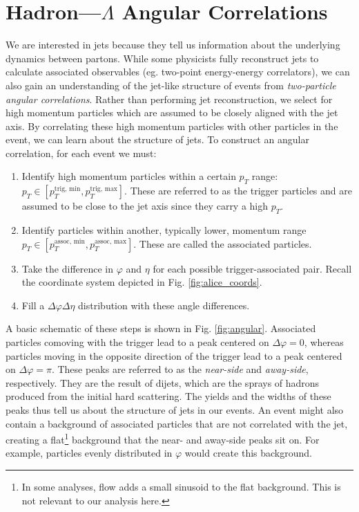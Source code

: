 \documentclass[../main.tex]{subfiles}
\begin{document}
\clearpage
\section{Hadron---$\Lambda$ Angular Correlations}
We are interested in jets because they tell us information about the underlying dynamics between partons. While some physicists fully reconstruct jets to calculate associated observables (eg. two-point energy-energy correlators), we can also gain an understanding of the jet-like structure of events from \textit{two-particle angular correlations}. Rather than performing jet reconstruction, we select for high momentum particles which are assumed to be closely aligned with the jet axis. By correlating these high momentum particles with other particles in the event, we can learn about the structure of jets. To construct an angular correlation, for each event we must:

\begin{enumerate}
    \item Identify high momentum particles within a certain $p_T$ range: $p_T \in [p_T^{\text{trig, min}}, p_T^{\text{trig, max}}]$. These are referred to as the trigger particles and are assumed to be close to the jet axis since they carry a high $p_T$. 
    \item Identify particles within another, typically lower, momentum range $p_T \in [p_T^{\text{assoc, min}}, p_T^{\text{assoc, max}}]$. These are called the associated particles. 
    \item Take the difference in $\varphi$ and $\eta$ for each possible trigger-associated pair. Recall the coordinate system depicted in Fig. \ref{fig:alice_coords}.
    \item Fill a $\Delta\varphi\Delta\eta$ distribution with these angle differences. 
\end{enumerate}


A basic schematic of these steps is shown in Fig. \ref{fig:angular}. Associated particles comoving with the trigger lead to a peak centered on $\Delta\varphi=0$, whereas particles moving in the opposite direction of the trigger lead to a peak centered on $\Delta\varphi=\pi$. These peaks are referred to as the \textit{near-side} and \textit{away-side}, respectively. They are the result of dijets, which are the sprays of hadrons produced from the initial hard scattering. The yields and the widths of these peaks thus tell us about the structure of jets in our events. An event might also contain a background of associated particles that are not correlated with the jet, creating a flat\footnote{In some analyses, flow adds a small sinusoid to the flat background. This is not relevant to our analysis here.} background that the near- and away-side peaks sit on. For example, particles evenly distributed in $\varphi$ would create this background. 
\end{document}
